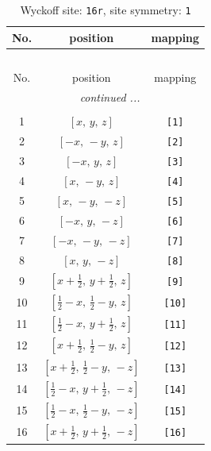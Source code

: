 \documentclass[fleqn,8pt]{jsarticle}
\begin{document}
\begin{longtable}{ccc}
\caption{Wyckoff site: {\tt 16r}, site symmetry: {\tt 1}}
 \\
 \hline \hline
No. & position & mapping \\ \hline \endfirsthead

\multicolumn{2}{l}{\tablename\ \thetable{}} \\
 \hline \hline
No. & position & mapping \\ \hline \endhead

 \hline \hline
\multicolumn{2}{r}{\footnotesize\it continued ...} \\ \endfoot

 \hline \hline
\multicolumn{2}{r}{} \\ \endlastfoot

1 & $\left[ x,\, y,\, z \right]$ & {\tt [1]} \\ \hline
2 & $\left[ - x,\, - y,\, z \right]$ & {\tt [2]} \\ \hline
3 & $\left[ - x,\, y,\, z \right]$ & {\tt [3]} \\ \hline
4 & $\left[ x,\, - y,\, z \right]$ & {\tt [4]} \\ \hline
5 & $\left[ x,\, - y,\, - z \right]$ & {\tt [5]} \\ \hline
6 & $\left[ - x,\, y,\, - z \right]$ & {\tt [6]} \\ \hline
7 & $\left[ - x,\, - y,\, - z \right]$ & {\tt [7]} \\ \hline
8 & $\left[ x,\, y,\, - z \right]$ & {\tt [8]} \\ \hline
9 & $\left[ x + \frac{1}{2},\, y + \frac{1}{2},\, z \right]$ & {\tt [9]} \\ \hline
10 & $\left[ \frac{1}{2} - x,\, \frac{1}{2} - y,\, z \right]$ & {\tt [10]} \\ \hline
11 & $\left[ \frac{1}{2} - x,\, y + \frac{1}{2},\, z \right]$ & {\tt [11]} \\ \hline
12 & $\left[ x + \frac{1}{2},\, \frac{1}{2} - y,\, z \right]$ & {\tt [12]} \\ \hline
13 & $\left[ x + \frac{1}{2},\, \frac{1}{2} - y,\, - z \right]$ & {\tt [13]} \\ \hline
14 & $\left[ \frac{1}{2} - x,\, y + \frac{1}{2},\, - z \right]$ & {\tt [14]} \\ \hline
15 & $\left[ \frac{1}{2} - x,\, \frac{1}{2} - y,\, - z \right]$ & {\tt [15]} \\ \hline
16 & $\left[ x + \frac{1}{2},\, y + \frac{1}{2},\, - z \right]$ & {\tt [16]} \\
\end{longtable}
\end{document}
